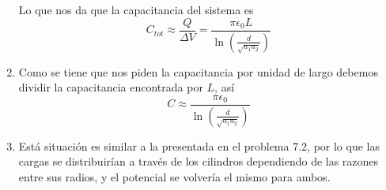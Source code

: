 \begin{enumerate}[label=\alph*)]
    Lo que nos da que la capacitancia del sistema es
    \[C_{tot} \approx \frac{Q}{\Delta V} = \frac{\pi \epsilon_0 L}{\ln{\left( \frac{d}{\sqrt{a_1a_2}} \right)}}\]
    
    \item Como se tiene que nos piden la capacitancia por unidad de largo debemos dividir la capacitancia encontrada por $L$, así
    \[C \approx \frac{\pi \epsilon_0}{\ln{\left( \frac{d}{\sqrt{a_1a_2}} \right)}}\]
    
    \item Está situación es similar a la presentada en el problema 7.2, por lo que las cargas se distribuirían a través de los cilindros dependiendo de las razones entre sus radios, y el potencial se volvería el mismo para ambos.
    
\end{enumerate}

\newline

